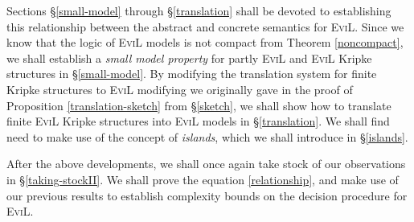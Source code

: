 Sections \S\ref{small-model} through \S\ref{translation} shall be
devoted to establishing this relationship between the abstract and
concrete semantics for \textsc{EviL}.
Since we know that the logic of \textsc{EviL} models is not compact
from Theorem \ref{noncompact}, we shall establish a
\emph{small model property} for partly \textsc{EviL} and \textsc{EviL}
Kripke structures in \S\ref{small-model}.  
By modifying the translation system for finite Kripke structures to
\textsc{EviL} modifying we originally gave in the proof of
Proposition \ref{translation-sketch} from \S\ref{sketch}, we shall
show how to translate finite \textsc{EviL} Kripke structures into
\textsc{EviL} models in \S\ref{translation}.  We shall find need to
make use of the concept of \emph{islands}, which we shall introduce in \S\ref{islands}.

After the above developments, we shall once again take stock of our
observations in \S\ref{taking-stockII}.  We shall prove the equation
\eqref{relationship}, and make use of our previous results to
establish complexity bounds on the decision procedure for \textsc{EviL}.

